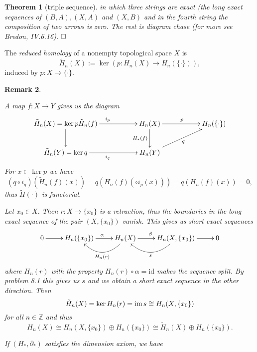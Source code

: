 \documentclass[11pt]{book}
\numberwithin{dummy}{section}
\newtheorem{theorem}{Theorem}[section]
\newtheorem{remark}[theorem]{Remark}
\theoremstyle{nonumberbreak}
\newenvironment{defin}[1][]{\ifthenelse{\equal{#1}{}}{\definition}{\definition[#1]}\rm}{\enddefinition}
\newenvironment{pr}[1][]{\ifthenelse{\equal{#1}{}}{\proof}{\proof[#1]}\rm}{\endproof}
\newcommand{\im}{\mathrm{im} \hspace{1.5pt}}
\newcommand{\la}{\longrightarrow}
\newcommand{\id}{\mathrm{id}}
\newcommand{\Z}{\mathbb{Z}}
\begin{document}
\begin{spacing}{1.4}
\begin{theorem}[triple sequence]
\begin{pr}
in which three strings are exact (the long exact sequences of $(B,A), (X,A)$ and $(X,B)$ and in the fourth string the composition of two arrows is zero. The rest is diagram chase (for more see Bredon, IV.6.16). $\hfill\Box$



\end{pr}




\end{theorem}


\begin{defin}
The \textit{reduced homology} of a nonempty topological space $X$ is 
$$\tilde{H}_n(X) := \ker \left(p: H_n(X) \la H_n(\{\cdot\}) \right),$$
induced by $p: X \la \{\cdot \}$. 

\end{defin}


\begin{remark}
\begin{compactenum}
\item A map $f: X \la Y$ gives us the diagram
$$
\begin{xy}
\xymatrix{
\tilde{H}_n(X) = \ker p \ar[rr]^{i_p} \ar[d]{\tilde{H}_n(f)} && H_n(X) \ar[d]_{H_*(f)} \ar[rr]^{p} && H_n(\{\cdot\}) \\
\tilde{H}_n(Y) = \ker q \ar[rr]_{i_q} && H_n(Y) \ar[rru]_{q} &&
}
\end{xy}
$$
For $x \in \ker p$ we have 
$$ (q \circ i_q)(\tilde{H}_n(f)(x)) = q \left(H_n(f) (\circ i_p(x))\right)  = q \left( H_n(f)(x)\right) = 0,$$
thus $\tilde{H}(\cdot)$ is functorial.
\item Let $x_0 \in X$. Then $r: X \la \{x_0\}$ is a retraction, thus the boundaries in the long exact sequence of the pair $(X, \{x_0\})$ vanish. This gives us short exact sequences
$$
\begin{xy}
\xymatrix{
0 \ar[r]& H_n(\{x_0\}) \ar[r]^{\alpha} & H_n(X) \ar@/^{20pt}/[l]^{H_n(r)} \ar[r]^{\beta} & H_n(X, \{x_0\}) \ar@/^{20pt}/[l]^{s} \ar[r] & 0
}
\end{xy}
$$
where $H_n(r)$ with the property $H_n(r) \circ \alpha = \id$ makes the sequence split. By problem 8.1 this gives us $s$ and we obtain a short exact sequence in the other direction. Then 
$$\tilde{H}_n(X) = \ker H_n(r) = \im s \cong H_n(X, \{x_0\})$$
for all $n \in \Z$ and thus
$$H_n(X) \cong H_n(X, \{x_0\}) \oplus H_n(\{x_0\}) \cong \tilde{H}_n(X) \oplus H_n(\{x_0\}).$$

\item If $(H_*, \partial_*)$ satisfies the dimension axiom, we have


\end{compactenum}
\end{remark}
\end{spacing}
\end{document}
